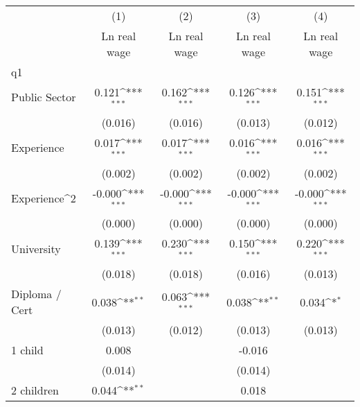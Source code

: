 {
\def\sym#1{\ifmmode^{#1}\else\(^{#1}\)\fi}
\begin{tabular}{l*{4}{c}}
\hline\hline
                    &\multicolumn{1}{c}{(1)}&\multicolumn{1}{c}{(2)}&\multicolumn{1}{c}{(3)}&\multicolumn{1}{c}{(4)}\\
                    &\multicolumn{1}{c}{Ln real wage}&\multicolumn{1}{c}{Ln real wage}&\multicolumn{1}{c}{Ln real wage}&\multicolumn{1}{c}{Ln real wage}\\
\hline
q1                  &                     &                     &                     &                     \\
Public Sector       &       0.121\sym{***}&       0.162\sym{***}&       0.126\sym{***}&       0.151\sym{***}\\
                    &     (0.016)         &     (0.016)         &     (0.013)         &     (0.012)         \\
[1em]
Experience          &       0.017\sym{***}&       0.017\sym{***}&       0.016\sym{***}&       0.016\sym{***}\\
                    &     (0.002)         &     (0.002)         &     (0.002)         &     (0.002)         \\
[1em]
Experience^{2}      &      -0.000\sym{***}&      -0.000\sym{***}&      -0.000\sym{***}&      -0.000\sym{***}\\
                    &     (0.000)         &     (0.000)         &     (0.000)         &     (0.000)         \\
[1em]
University          &       0.139\sym{***}&       0.230\sym{***}&       0.150\sym{***}&       0.220\sym{***}\\
                    &     (0.018)         &     (0.018)         &     (0.016)         &     (0.013)         \\
[1em]
Diploma / Cert      &       0.038\sym{**} &       0.063\sym{***}&       0.038\sym{**} &       0.034\sym{*}  \\
                    &     (0.013)         &     (0.012)         &     (0.013)         &     (0.013)         \\
[1em]
1 child             &       0.008         &                     &      -0.016         &                     \\
                    &     (0.014)         &                     &     (0.014)         &                     \\
[1em]
2 children          &       0.044\sym{**} &                     &       0.018         &                     \\

\end{tabular}}
